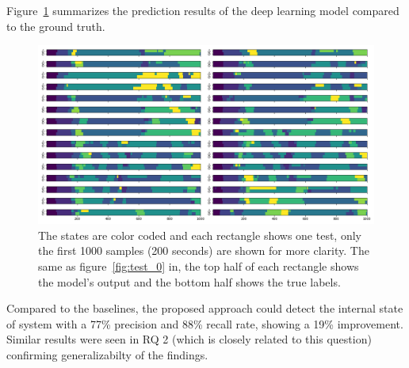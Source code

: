Figure~\ref{fig:paparazzi_predictions} summarizes the prediction results of the deep learning model compared to the ground truth. 
\begin{figure}
    \centering
    \includegraphics[width=\columnwidth]{RQ3-5_charts/states_chart.png}
    \caption{The states are color coded and each rectangle shows one test, only the first 1000 samples (200 seconds) are shown for more clarity. The same as figure~\ref{fig:test_0} in, the top half of each rectangle shows the model's output and the bottom half shows the true labels.}
    \label{fig:paparazzi_predictions}
\end{figure}


\begin{rqanswer}
Compared to the baselines, the proposed approach could detect the internal state of system with a 77\% precision and 88\% recall rate, showing a 19\% improvement. Similar results were seen in RQ 2 (which is closely related to this question) confirming generalizabilty of the findings.
\end{rqanswer}

